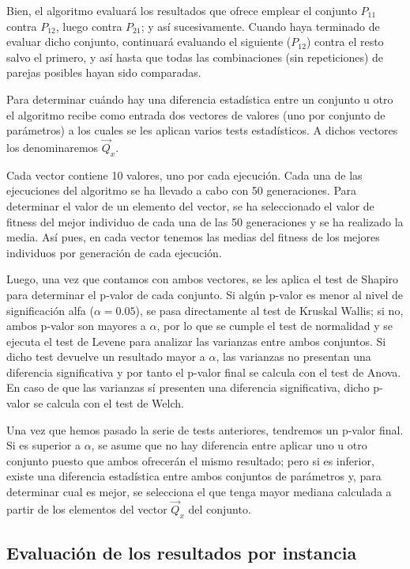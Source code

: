 Bien, el algoritmo evaluará los resultados que ofrece emplear el conjunto $P_{11}$ contra $P_{12}$, luego contra $P_{21}$; y así sucesivamente. Cuando haya terminado de evaluar dicho conjunto, continuará evaluando el siguiente ($P_{12}$) contra el resto salvo el primero, y así hasta que todas las combinaciones (sin repeticiones) de parejas posibles hayan sido comparadas.

Para determinar cuándo hay una diferencia estadística entre un conjunto u otro el algoritmo recibe como entrada dos vectores de valores (uno por conjunto de parámetros) a los cuales se les aplican varios tests estadísticos. A dichos vectores los denominaremos $\vec{Q}_x$.

Cada vector contiene 10 valores, uno por cada ejecución. Cada una de las ejecuciones del algoritmo se ha llevado a cabo con 50 generaciones. Para determinar el valor de un elemento del vector, se ha seleccionado el valor de fitness del mejor individuo de cada una de las 50 generaciones y se ha realizado la media. Así pues, en cada vector tenemos las medias del fitness de los mejores individuos por generación de cada ejecución.

Luego, una vez que contamos con ambos vectores, se les aplica el test de Shapiro para determinar el p-valor de cada conjunto. Si algún p-valor es menor al nivel de significación alfa ($\alpha = 0.05$), se pasa directamente al test de Kruskal Wallis; si no, ambos p-valor son mayores a $\alpha$, por lo que se cumple el test de normalidad y se ejecuta el test de Levene para analizar las varianzas entre ambos conjuntos. Si dicho test devuelve un resultado mayor a $\alpha$, las varianzas no presentan una diferencia significativa y por tanto el p-valor final se calcula con el test de Anova. En caso de que las varianzas sí presenten una diferencia significativa, dicho p-valor se calcula con el test de Welch.

Una vez que hemos pasado la serie de tests anteriores, tendremos un p-valor final. Si es superior a $\alpha$, se asume que no hay diferencia entre aplicar uno u otro conjunto puesto que ambos ofrecerán el mismo resultado; pero si es inferior, existe una diferencia estadística entre ambos conjuntos de parámetros y, para determinar cual es mejor, se selecciona el que tenga mayor mediana calculada a partir de los elementos del vector $\vec{Q}_x$ del conjunto.

\subsection{Evaluación de los resultados por instancia}

